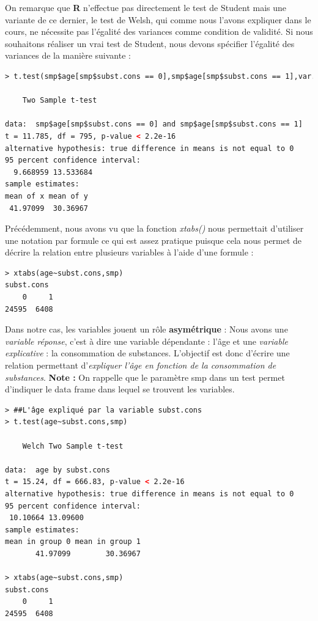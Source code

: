 On remarque que \textbf{R} n'effectue pas directement le test de Student mais une variante de ce dernier, le test de Welsh, qui comme nous l'avons expliquer dans le cours, ne nécessite pas l'égalité des variances comme condition de validité.\newline 
Si nous souhaitons réaliser un vrai test de Student, nous devons spécifier l'égalité des variances de la manière suivante : 
\begin{lstlisting}[language=html]
> t.test(smp$age[smp$subst.cons == 0],smp$age[smp$subst.cons == 1],var.equal = TRUE)

	Two Sample t-test

data:  smp$age[smp$subst.cons == 0] and smp$age[smp$subst.cons == 1]
t = 11.785, df = 795, p-value < 2.2e-16
alternative hypothesis: true difference in means is not equal to 0
95 percent confidence interval:
  9.668959 13.533684
sample estimates:
mean of x mean of y 
 41.97099  30.36967 
\end{lstlisting}

Précédemment, nous avons vu que la fonction \textit{xtabs()} nous permettait d'utiliser une notation par formule ce qui est assez pratique puisque cela nous permet de décrire la relation entre plusieurs variables à l'aide d'une formule :

\begin{lstlisting}[language=html]
> xtabs(age~subst.cons,smp)
subst.cons
    0     1 
24595  6408 
\end{lstlisting}

Dans notre cas, les variables jouent un rôle \textbf{asymétrique} : Nous avons une \textit{variable réponse}, c'est à dire une variable dépendante : l'âge et une \textit{variable explicative} : la consommation de substances.\newline
L'objectif est donc d'écrire une relation permettant d'\textit{expliquer l'âge en fonction de la consommation de substances}.\newline
\textbf{Note :} On rappelle que le paramètre smp dans un test permet d'indiquer le data frame dans lequel se trouvent les variables.

\begin{lstlisting}[language=html]
> ##L'âge expliqué par la variable subst.cons
> t.test(age~subst.cons,smp)

	Welch Two Sample t-test

data:  age by subst.cons
t = 15.24, df = 666.83, p-value < 2.2e-16
alternative hypothesis: true difference in means is not equal to 0
95 percent confidence interval:
 10.10664 13.09600
sample estimates:
mean in group 0 mean in group 1 
       41.97099        30.36967 

> xtabs(age~subst.cons,smp)
subst.cons
    0     1 
24595  6408 
\end{lstlisting}

